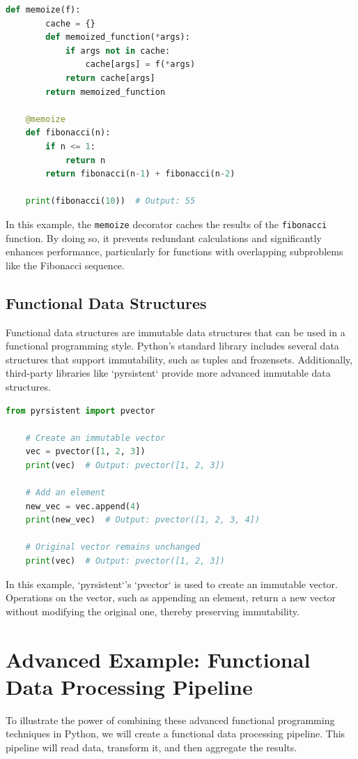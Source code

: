 \documentclass[a4paper]{article}
\begin{document}
\begin{lstlisting}[language=Python, caption=Memoization Example]
    def memoize(f):
        cache = {}
        def memoized_function(*args):
            if args not in cache:
                cache[args] = f(*args)
            return cache[args]
        return memoized_function

    @memoize
    def fibonacci(n):
        if n <= 1:
            return n
        return fibonacci(n-1) + fibonacci(n-2)

    print(fibonacci(10))  # Output: 55
\end{lstlisting}

In this example, the \texttt{memoize} decorator caches the results of the \texttt{fibonacci} function. By doing so, it prevents redundant calculations and significantly enhances performance, particularly for functions with overlapping subproblems like the Fibonacci sequence.

\subsection{Functional Data Structures}
Functional data structures are immutable data structures that can be used in a functional programming style. Python's standard library includes several data structures that support immutability, such as tuples and frozensets. Additionally, third-party libraries like `pyrsistent` provide more advanced immutable data structures.

\begin{lstlisting}[language=Python, caption=Functional Data Structures Example]
    from pyrsistent import pvector

    # Create an immutable vector
    vec = pvector([1, 2, 3])
    print(vec)  # Output: pvector([1, 2, 3])

    # Add an element
    new_vec = vec.append(4)
    print(new_vec)  # Output: pvector([1, 2, 3, 4])

    # Original vector remains unchanged
    print(vec)  # Output: pvector([1, 2, 3])
\end{lstlisting}

In this example, `pyrsistent`'s `pvector` is used to create an immutable vector. Operations on the vector, such as appending an element, return a new vector without modifying the original one, thereby preserving immutability.

\newpage
\section{Advanced Example: Functional Data Processing Pipeline}
To illustrate the power of combining these advanced functional programming techniques in Python, we will create a functional data processing pipeline. This pipeline will read data, transform it, and then aggregate the results. 
\end{document}
